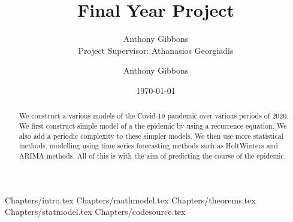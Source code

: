 \documentclass[a4paper]{article}
\title{Final Year Project}
\author{Anthony Gibbons \qquad 17322353 \\ Project Supervisor: Athanasios Georgiadis}
\author{Anthony Gibbons}
\date{\today}
\begin{document}
\maketitle      

\begin{abstract}
    We construct a various models of the Covid-19 pandemic over various periods of 2020. We first construct simple model of a the epidemic by using a recurrence equation. We also add a periodic complexity to these simpler models. We then use more statistical methods, modelling using time series forecasting methods such as HoltWinters and ARIMA methods. All of this is with the aim of predicting the course of the epidemic.
\end{abstract}
\hypersetup{
    linkcolor=blue,
}
{Chapters/intro.tex}
{Chapters/mathmodel.tex}
{Chapters/theorems.tex}
{Chapters/statmodel.tex}
{Chapters/codesource.tex}

\printbibliography
\end{document}
